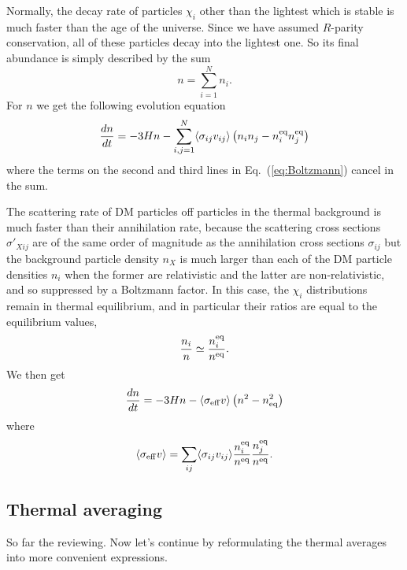 Normally, the decay rate of particles $\chi_i$ other
than the lightest which is stable is much faster than the age of the
universe. Since we have assumed $R$-parity conservation, all of these
particles decay into the lightest one. So its final abundance is
simply described by the sum
\begin{equation}
  n= \sum_{i=1}^N n_{i}.
\end{equation}
For $n$ we get the following evolution equation
\begin{equation}
  \frac{dn}{dt} = -3Hn - \sum_{i,j=1}^N \langle \sigma_{ij} v_{ij} \rangle 
  \left( n_{i}n_{j} - n_{i}^{\rm{eq}}n_{j}^{\rm{eq}} \right)
\end{equation}
where the terms on the second and third lines in
Eq.~(\ref{eq:Boltzmann}) cancel in the sum. 

The scattering rate of DM particles off particles in the
thermal background is much faster than their annihilation rate,
because the scattering cross sections $\sigma'_{Xij}$ are of the same
order of magnitude as the annihilation cross sections $\sigma_{ij}$
but the background particle density $n_X$ is much larger than each of
the DM particle densities $n_i$ when the former are
relativistic and the latter are non-relativistic, and so suppressed by
a Boltzmann factor. In this case, the $\chi_i$ distributions remain in
thermal equilibrium, and in particular their ratios are equal to the
equilibrium values,
\begin{equation}
  \frac{n_{i}}{n} \simeq \frac{n_{i}^{\rm{eq}}}{n^{\rm{eq}}}.
\end{equation}
We then get
\begin{equation} \label{eq:Boltzmann2}
  \frac{dn}{dt} =
  -3Hn - \langle \sigma_{\rm{eff}} v \rangle 
  \left( n^2 - n_{\rm{eq}}^2 \right)
\end{equation}
where
\begin{equation} \label{eq:sigmaveffdef}
  \langle \sigma_{\rm{eff}} v \rangle = \sum_{ij} \langle
  \sigma_{ij}v_{ij} \rangle \frac{n_{i}^{\rm{eq}}}{n^{\rm{eq}}}
  \frac{n_{j}^{\rm{eq}}}{n^{\rm{eq}}}.
\end{equation}


\subsection{Thermal averaging}
\label{sec:thermav}

So far the reviewing. Now let's continue
by reformulating the thermal averages into
more convenient expressions. 


